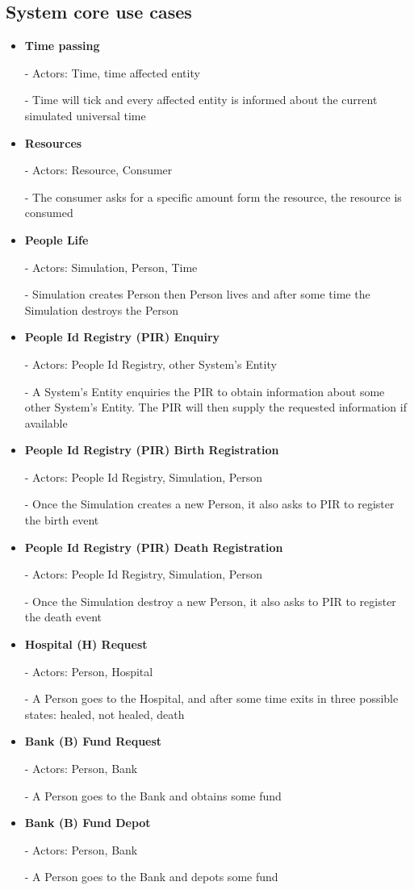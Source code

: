 \subsection{System core use cases}
\begin{itemize}
  \item \textbf{Time passing}  
	
	- Actors: Time, time affected entity

	- Time will tick and every affected entity is informed about the current simulated universal time

  \item \textbf{Resources}

	- Actors: Resource, Consumer

	- The consumer asks for a specific amount form the resource, the resource is consumed

  \item \textbf{People Life} 

	- Actors: Simulation, Person, Time

	- Simulation creates Person then Person lives and after some time the Simulation destroys the Person

  \item \textbf{People Id Registry (PIR) Enquiry}

	- Actors: People Id Registry, other System's Entity

	- A System's Entity enquiries the PIR to obtain information about some other System's Entity. The PIR will then supply the requested information  if available

  \item \textbf{People Id Registry (PIR) Birth Registration}

	- Actors: People Id Registry, Simulation, Person

	- Once the Simulation creates a new Person, it also asks to PIR to register the birth event

  \item \textbf{People Id Registry (PIR) Death Registration}

	- Actors: People Id Registry, Simulation, Person

	- Once the Simulation destroy a new Person, it also asks to PIR to register the death event

  \item \textbf{Hospital (H) Request}

	- Actors: Person, Hospital

	- A Person goes to the Hospital, and after some time exits in three possible states: healed, not healed, death

  \item \textbf{Bank (B) Fund Request}

	- Actors: Person, Bank

	- A Person goes to the Bank and obtains some fund

  \item \textbf{Bank (B) Fund Depot}

	- Actors: Person, Bank

	- A Person goes to the Bank and depots some fund
\end{itemize}


